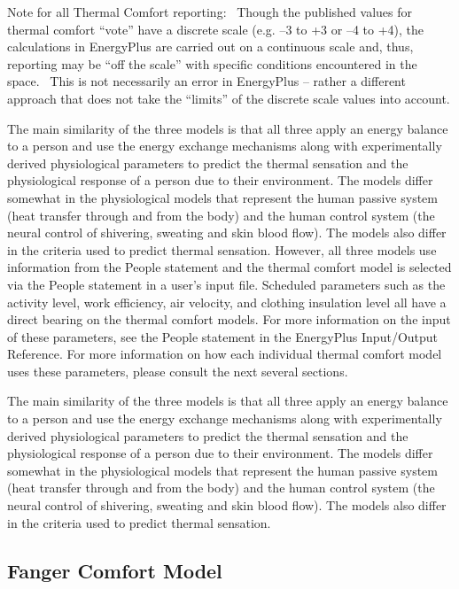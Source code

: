 Note for all Thermal Comfort reporting:~ Though the published values for thermal comfort ``vote'' have a discrete scale (e.g. --3 to +3 or --4 to +4), the calculations in EnergyPlus are carried out on a continuous scale and, thus, reporting may be ``off the scale'' with specific conditions encountered in the space.~ This is not necessarily an error in EnergyPlus -- rather a different approach that does not take the ``limits'' of the discrete scale values into account.

The main similarity of the three models is that all three apply an energy balance to a person and use the energy exchange mechanisms along with experimentally derived physiological parameters to predict the thermal sensation and the physiological response of a person due to their environment. The models differ somewhat in the physiological models that represent the human passive system (heat transfer through and from the body) and the human control system (the neural control of shivering, sweating and skin blood flow). The models also differ in the criteria used to predict thermal sensation. However, all three models use information from the People statement and the thermal comfort model is selected via the People statement in a user's input file. Scheduled parameters such as the activity level, work efficiency, air velocity, and clothing insulation level all have a direct bearing on the thermal comfort models. For more information on the input of these parameters, see the People statement in the EnergyPlus Input/Output Reference. For more information on how each individual thermal comfort model uses these parameters, please consult the next several sections.

The main similarity of the three models is that all three apply an energy balance to a person and use the energy exchange mechanisms along with experimentally derived physiological parameters to predict the thermal sensation and the physiological response of a person due to their environment. The models differ somewhat in the physiological models that represent the human passive system (heat transfer through and from the body) and the human control system (the neural control of shivering, sweating and skin blood flow). The models also differ in the criteria used to predict thermal sensation.

\subsection{Fanger Comfort Model}\label{fanger-comfort-model}

